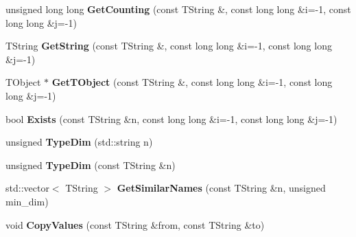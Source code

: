 \begin{DoxyCompactItemize}
\item 
\hypertarget{class_h_a_l_1_1_analysis_data_af7d47f613b3745eae74b59e82d718b5b}{unsigned long long {\bfseries Get\+Counting} (const T\+String \&, const long long \&i=-\/1, const long long \&j=-\/1)}\label{class_h_a_l_1_1_analysis_data_af7d47f613b3745eae74b59e82d718b5b}

\item 
\hypertarget{class_h_a_l_1_1_analysis_data_a983d806a18f7d81bf7b0405375442e9d}{T\+String {\bfseries Get\+String} (const T\+String \&, const long long \&i=-\/1, const long long \&j=-\/1)}\label{class_h_a_l_1_1_analysis_data_a983d806a18f7d81bf7b0405375442e9d}

\item 
\hypertarget{class_h_a_l_1_1_analysis_data_af1d5b191d8ccec6fb120a7debee1a474}{T\+Object $\ast$ {\bfseries Get\+T\+Object} (const T\+String \&, const long long \&i=-\/1, const long long \&j=-\/1)}\label{class_h_a_l_1_1_analysis_data_af1d5b191d8ccec6fb120a7debee1a474}

\item 
\hypertarget{class_h_a_l_1_1_analysis_data_a88485900b08fc820b2021234699d72d9}{bool {\bfseries Exists} (const T\+String \&n, const long long \&i=-\/1, const long long \&j=-\/1)}\label{class_h_a_l_1_1_analysis_data_a88485900b08fc820b2021234699d72d9}

\item 
\hypertarget{class_h_a_l_1_1_analysis_data_a493762f931219f8a720d06a263a4ad23}{unsigned {\bfseries Type\+Dim} (std\+::string n)}\label{class_h_a_l_1_1_analysis_data_a493762f931219f8a720d06a263a4ad23}

\item 
\hypertarget{class_h_a_l_1_1_analysis_data_ab0c4af2c4db8ebe38fd883ed0a2c2a72}{unsigned {\bfseries Type\+Dim} (const T\+String \&n)}\label{class_h_a_l_1_1_analysis_data_ab0c4af2c4db8ebe38fd883ed0a2c2a72}

\item 
\hypertarget{class_h_a_l_1_1_analysis_data_ae12492f13299eabe287205392489a4c4}{std\+::vector$<$ T\+String $>$ {\bfseries Get\+Similar\+Names} (const T\+String \&n, unsigned min\+\_\+dim)}\label{class_h_a_l_1_1_analysis_data_ae12492f13299eabe287205392489a4c4}

\item 
\hypertarget{class_h_a_l_1_1_analysis_data_a02f185a0bb593efe8f1e1605a8db7212}{void {\bfseries Copy\+Values} (const T\+String \&from, const T\+String \&to)}\label{class_h_a_l_1_1_analysis_data_a02f185a0bb593efe8f1e1605a8db7212}


\end{DoxyCompactItemize}
